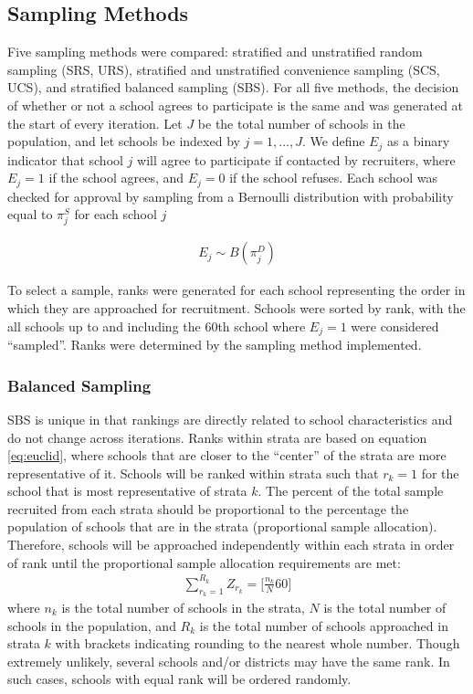 \documentclass[man,floatsintext]{apa6}
\theoremstyle{definition}
\theoremstyle{definition}
\theoremstyle{definition}
\theoremstyle{remark}
\begin{document}
\hypertarget{sampling-methods}{%
\subsection{Sampling Methods}\label{sampling-methods}}

Five sampling methods were compared: stratified and unstratified random
sampling (SRS, URS), stratified and unstratified convenience sampling
(SCS, UCS), and stratified balanced sampling (SBS). For all five
methods, the decision of whether or not a school agrees to participate
is the same and was generated at the start of every iteration. Let \(J\)
be the total number of schools in the population, and let schools be
indexed by \(j = 1, ..., J\). We define \(E_j\) as a binary indicator
that school \(j\) will agree to participate if contacted by recruiters,
where \(E_j = 1\) if the school agrees, and \(E_j = 0\) if the school
refuses. Each school was checked for approval by sampling from a
Bernoulli distribution with probability equal to \(\pi^S_j\) for each
school \(j\)

\begin{align} \label{eq:Ej}
  E_j \sim B(\pi^D_j)
\end{align}

To select a sample, ranks were generated for each school representing
the order in which they are approached for recruitment. Schools were
sorted by rank, with the all schools up to and including the 60th school
where \(E_j = 1\) were considered \enquote{sampled}. Ranks were
determined by the sampling method implemented.

\hypertarget{balanced-sampling}{%
\subsubsection{Balanced Sampling}\label{balanced-sampling}}

SBS is unique in that rankings are directly related to school
characteristics and do not change across iterations. Ranks within strata
are based on equation \eqref{eq:euclid}, where schools that are closer to
the \enquote{center} of the strata are more representative of it.
Schools will be ranked within strata such that \(r_k= 1\) for the school
that is most representative of strata \(k\). The percent of the total
sample recruited from each strata should be proportional to the
percentage the population of schools that are in the strata
(proportional sample allocation). Therefore, schools will be approached
independently within each strata in order of rank until the proportional
sample allocation requirements are met:
\begin{align} \label{eq:rankCASS}
  \sum_{r_{k}=1}^{R_k}{Z_{r_k} = [\frac{n_k}{N}60}]
\end{align} where \(n_k\) is the total number of schools in the strata,
\(N\) is the total number of schools in the population, and \(R_k\) is
the total number of schools approached in strata \(k\) with brackets
indicating rounding to the nearest whole number. Though extremely
unlikely, several schools and/or districts may have the same rank. In
such cases, schools with equal rank will be ordered randomly.
\end{document}
